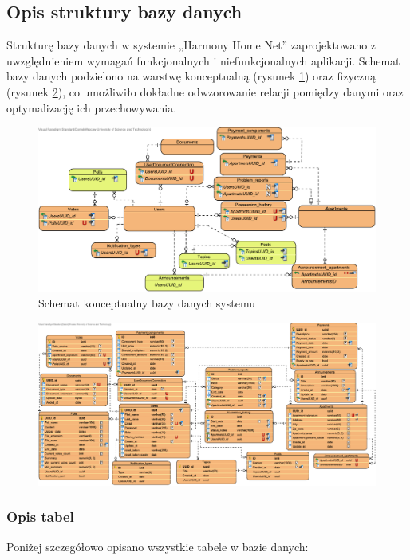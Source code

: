 \subsection{Opis struktury bazy danych}

Strukturę bazy danych w systemie „Harmony Home Net” zaprojektowano z uwzględnieniem wymagań funkcjonalnych i niefunkcjonalnych aplikacji. Schemat bazy danych podzielono na warstwę konceptualną (rysunek \ref{fig:ebok_db_concept}) oraz fizyczną (rysunek \ref{fig:ebok_db_physical}), co umożliwiło dokładne odwzorowanie relacji pomiędzy danymi oraz optymalizację ich przechowywania.
\begin{figure}[ht]
    \centering
    \includegraphics[width=.9\linewidth]{rys03/ebok_db_concept}
    \caption{Schemat konceptualny bazy danych systemu}
    \label{fig:ebok_db_concept}
\end{figure}
\begin{figure}[ht]
    \centering
    \includegraphics[width=1\linewidth]{rys03/ebok_db_physical}
    \label{fig:ebok_db_physical}
\end{figure}

\subsubsection{Opis tabel}
Poniżej szczegółowo opisano wszystkie tabele w bazie danych:

